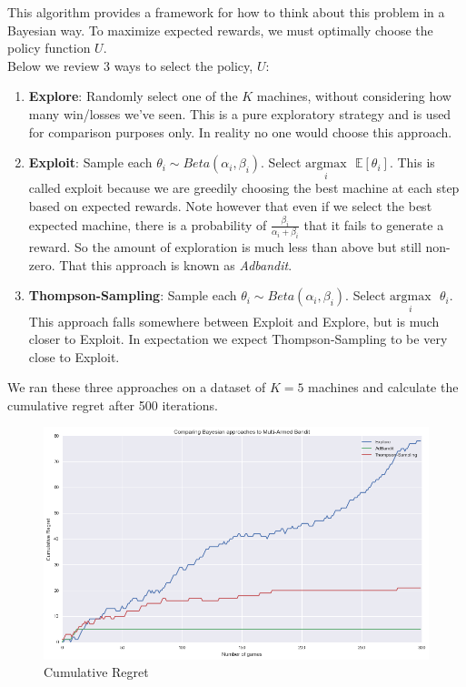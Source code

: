 \documentclass{article}
\begin{document}
This algorithm provides a framework for how to think about this problem in a Bayesian way. To maximize expected rewards, we must optimally choose the policy function $U$.\\

Below we review 3 ways to select the policy, $U$:

\begin{enumerate}
\item \textbf{Explore}: Randomly select one of the $K$ machines, without considering how many win/losses we've seen. This is a pure exploratory strategy and is used for comparison purposes only. In reality no one would choose this approach.
\item \textbf{Exploit}: Sample each $\theta_i \sim Beta(\alpha_i, \beta_i)$. Select $\underset{i}{\text{argmax}}\text{ }\mathbb{E}[\theta_i]$. This is called exploit because we are greedily choosing the best machine at each step based on expected rewards. Note however that even if we select the best expected machine, there is a probability of $\frac{\beta_i}{\alpha_i + \beta_i}$ that it fails to generate a reward. So the amount of exploration is much less than above but still non-zero. That this approach is known as \textit{Adbandit}.
\item \textbf{Thompson-Sampling}: Sample each $\theta_i \sim Beta(\alpha_i, \beta_i)$. Select $\underset{i}{\text{argmax}}\text{ }\theta_i$. This approach falls somewhere between Exploit and Explore, but is much closer to Exploit. In expectation we expect Thompson-Sampling to be very close to Exploit.
\end{enumerate}

We ran these three approaches on a dataset of $K=5$ machines and calculate the cumulative regret after 500 iterations.

\begin{figure}[H]
\centering
\includegraphics[scale=0.4]{thompson_regret.png}
\caption{Cumulative Regret}
\end{figure}
\end{document}
